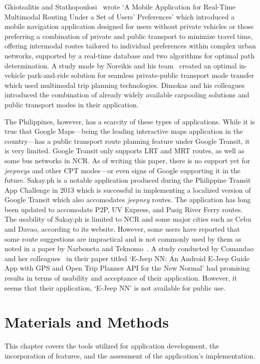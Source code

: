 \documentclass[journal]{./IEEE/IEEEtran}
\begin{document}
Gkiotsalitis and Stathopoulosi~\cite{Gkiotsalitis15} wrote `A Mobile Application for Real-Time Multimodal Routing Under a Set of Users’ Preferences' which introduced a mobile navigation application designed for users without private vehicles or those preferring a combination of private and public transport to minimize travel time, offering intermodal routes tailored to individual preferences within complex urban networks, supported by a real-time database and two algorithms for optimal path determination.
A study made by Noreikis and his team~\cite{Noreikis14} created an optimal in-vehicle park-and-ride solution for seamless private-public transport mode transfer which used multimodal trip planning technologies.
Dimokas and his colleagues~\cite{Dimokas18} introduced the combination of already widely available carpooling solutions and public transport modes in their application.

The Philippines, however, has a scarcity of these types of applications. While it is true that Google Maps---being the leading interactive maps application in the country---has a public transport route planning feature under Google Transit, it is very limited.
Google Transit only supports LRT and MRT routes, as well as some bus networks in NCR\@.
As of writing this paper, there is no support yet for \textit{jeepneys} and other CPT modes---or even signs of Google supporting it in the future.
Sakay.ph is a notable application produced during the Philippine Transit App Challenge in 2013 which is successful in implementing a localized version of Google Transit which also accomodates \textit{jeepney} routes.
The application has long been updated to accomodate P2P, UV Express, and Pasig River Ferry routes. The usability of Sakay.ph is limited to NCR and some major cities such as Cebu and Davao, according to its website. However, some users have reported that some route suggestions are impractical and is not commonly used by them as noted in a paper by Narboneta and Teknomo~\cite{Narboneta15}.
A study conducted by Comandao and her colleagues~\cite{Comandao21} in their paper titled `E-Jeep NN\@: An Android E-Jeep Guide App with GPS and Open Trip Planner API for the New Normal' had promising results in terms of usability and acceptance of their application.
However, it seems that their application, `E-Jeep NN' is not available for public use.

\section{Materials and Methods}
This chapter covers the tools utilized for application development, the incorporation of features, and the assessment of the application's implementation.
\end{document}
